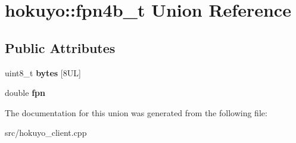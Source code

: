 \hypertarget{unionhokuyo_1_1fpn4b__t}{\section{hokuyo\-:\-:fpn4b\-\_\-t Union Reference}
\label{unionhokuyo_1_1fpn4b__t}
}
\subsection*{Public Attributes}
\begin{DoxyCompactItemize}
\item 
\hypertarget{unionhokuyo_1_1fpn4b__t_a22afb0bd4af1b752e365f67335f49e97}{uint8\-\_\-t {\bfseries bytes} \mbox{[}8\-U\-L\mbox{]}}\label{unionhokuyo_1_1fpn4b__t_a22afb0bd4af1b752e365f67335f49e97}

\item 
\hypertarget{unionhokuyo_1_1fpn4b__t_a14c818fca2156565697f67945b96acca}{double {\bfseries fpn}}\label{unionhokuyo_1_1fpn4b__t_a14c818fca2156565697f67945b96acca}

\end{DoxyCompactItemize}


The documentation for this union was generated from the following file\-:\begin{DoxyCompactItemize}
\item 
src/hokuyo\-\_\-client.\-cpp\end{DoxyCompactItemize}
